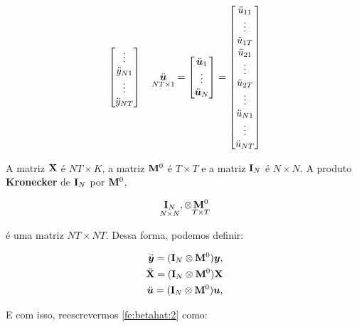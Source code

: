\documentclass[11pt, oneside, a4paper, article]{article}
\numberwithin{equation}{section}
\begin{document}
\begin{align*}
\begin{bmatrix}
	\vdots \\
	\ddot{y}_{N1} \\ \vdots \\ \ddot{y}_{NT} \\
\end{bmatrix}
\quad
\underset{NT \times 1}{\ddot{\boldsymbol{u}}} = 
\begin{bmatrix}
\ddot{\boldsymbol{u}}_{1} \\ \vdots \\ \ddot{\boldsymbol{u}}_{N}
\end{bmatrix}
=
\begin{bmatrix}
	\ddot{u}_{11} \\ \vdots \\ \ddot{u}_{1T} \\
	\ddot{u}_{21} \\ \vdots \\ \ddot{u}_{2T} \\
	\vdots \\
	\ddot{u}_{N1} \\ \vdots \\ \ddot{u}_{NT} \\
\end{bmatrix}
\end{align*}


\vspace{1 em}
\noindent
A matriz $\mathbf{X}$ é $NT \times K$, a matriz $\mathbf{M}^{0}$ é $T \times T$ e a matriz $\mathbf{I}_{N}$ é $N \times N$.
A produto \textbf{Kronecker} de $\mathbf{I}_{N}$ por $\mathbf{M}^{0}$,

\vspace{-1 em}
\begin{align*}
\underset{N \times N}{\mathbf{I}_{N}},
\otimes
\underset{T \times T}{\mathbf{M}^{0}}
\end{align*}

\noindent
é uma matriz $NT \times NT$.
Dessa forma, podemos definir:

\vspace{-1 em}
\begin{align*}
\ddot{\boldsymbol{y}} = ( \mathbf{I}_{N} \otimes \mathbf{M}^{0} ) \boldsymbol{y},
\\
\ddot{\mathbf{X}} = ( \mathbf{I}_{N} \otimes \mathbf{M}^{0} ) \mathbf{X}
\\
\ddot{\boldsymbol{u}} = ( \mathbf{I}_{N} \otimes \mathbf{M}^{0} ) \boldsymbol{u},
\end{align*}

\vspace{1 em}
\noindent
E com isso, reescrevermos \eqref{fe:betahat:2} como:
\end{document}
